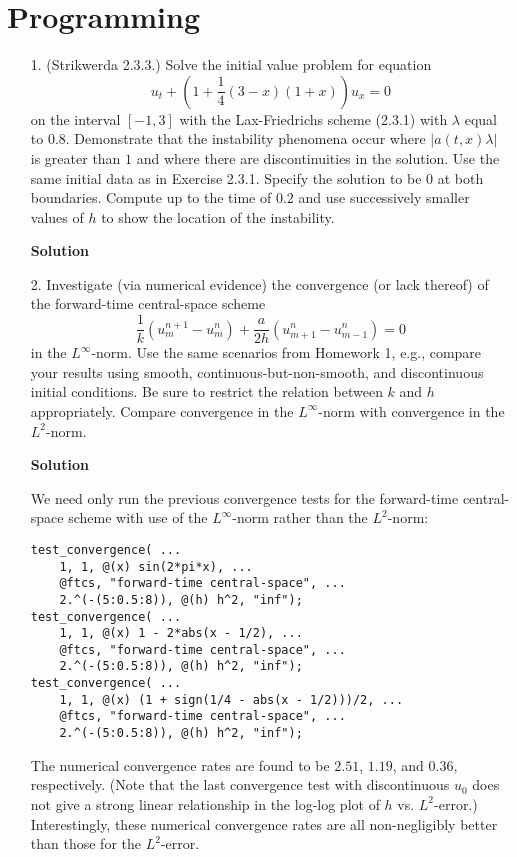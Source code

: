 \documentclass{article}
\providecommand{\abs}[1]{\left\lvert#1\right\rvert}
\begin{document}
\section{Programming}

\begin{itemize}

\item[1.] (Strikwerda 2.3.3.) Solve the initial value problem for equation
\begin{equation*}
u_t + \left( 1 + \frac{1}{4} \left( 3 - x \right) \left( 1 + x \right) \right) u_x = 0
\end{equation*}
on the interval $[-1,3]$ with the Lax-Friedrichs scheme (2.3.1) with $\lambda$ equal to $0.8$. Demonstrate that the instability phenomena occur where $\abs{a(t,x) \lambda}$ is greater than $1$ and where there are discontinuities in the solution. Use the same initial data as in Exercise 2.3.1. Specify the solution to be $0$ at both boundaries. Compute up to the time of $0.2$ and use successively smaller values of $h$ to show the location of the instability.

\textbf{Solution}

\item[2.] Investigate (via numerical evidence) the convergence (or lack thereof) of the forward-time central-space scheme
\begin{equation*}
\frac{1}{k} \left( u^{n+1}_m - u^n_m \right) + \frac{a}{2h} \left( u^n_{m+1} - u^n_{m-1} \right) = 0
\end{equation*}
in the $L^{\infty}$-norm. Use the same scenarios from Homework 1, e.g., compare your results using smooth, continuous-but-non-smooth, and discontinuous initial conditions. Be sure to restrict the relation between $k$ and $h$ appropriately. Compare convergence in the $L^{\infty}$-norm with convergence in the $L^2$-norm.

\textbf{Solution}

We need only run the previous convergence tests for the forward-time central-space scheme with use of the $L^{\infty}$-norm rather than the $L^2$-norm:

\begin{verbatim}
test_convergence( ...
    1, 1, @(x) sin(2*pi*x), ...
    @ftcs, "forward-time central-space", ...
    2.^(-(5:0.5:8)), @(h) h^2, "inf");
test_convergence( ...
    1, 1, @(x) 1 - 2*abs(x - 1/2), ...
    @ftcs, "forward-time central-space", ...
    2.^(-(5:0.5:8)), @(h) h^2, "inf");
test_convergence( ...
    1, 1, @(x) (1 + sign(1/4 - abs(x - 1/2)))/2, ...
    @ftcs, "forward-time central-space", ...
    2.^(-(5:0.5:8)), @(h) h^2, "inf");
\end{verbatim}

The numerical convergence rates are found to be $2.51$, $1.19$, and $0.36$, respectively. (Note that the last convergence test with discontinuous $u_0$ does not give a strong linear relationship in the log-log plot of $h$ vs. $L^2$-error.) Interestingly, these numerical convergence rates are all non-negligibly better than those for the $L^2$-error.

\end{itemize}
\end{document}
